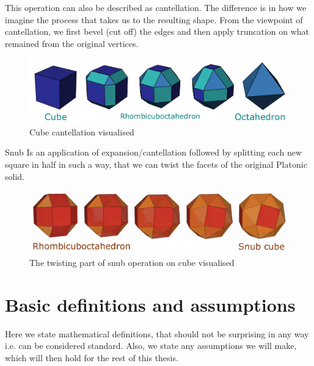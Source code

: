 \begin{description}
    This operation can also be described as cantellation. The difference is in how we imagine the process that takes us to the resulting shape. From the viewpoint of cantellation, we first bevel (cut off) the edges and then apply truncation on what remained from the original vertices.
    \begin{figure}[H]
        \centering
        \includegraphics[width=1\textwidth]{../Resources/Figs/op_cantellation.pdf}
        \caption{Cube cantellation visualised \cite{wikimedia-cube-cantellation}}
        \label{fig:op_cantellation}
    \end{figure}
    \begin{highlight}
    \item[Snub] Is an application of expansion/cantellation followed by splitting each new square in half in such a way, that we can twist the facets of the original Platonic solid.
    \end{highlight}
    \begin{figure}[H]
        \centering
        \includegraphics[width=1\textwidth]{../Resources/Figs/op_snub.pdf}
        \caption{The twisting part of snub operation on cube visualised \cite{natal-polyhed-viewer}}
        \label{fig:op_snub}
    \end{figure}
    
\end{description}

\section{Basic definitions and assumptions}

Here we state mathematical definitions, that should not be surprising in any way i.e. can be considered standard. Also, we state any assumptions we will make, which will then hold for the rest of this thesis.

